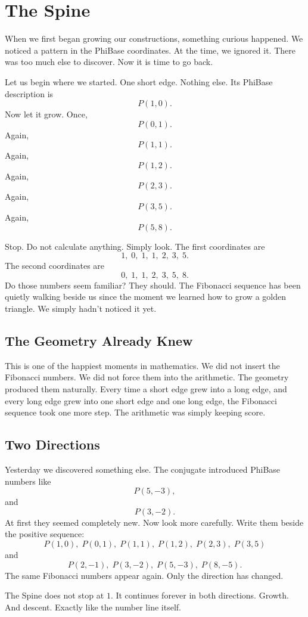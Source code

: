 \chapter{The Spine}
\label{stone:spine}

When we first began growing our constructions, something curious happened. We noticed a pattern in the PhiBase coordinates. At the time, we ignored it. There was too much else to discover. Now it is time to go back.

Let us begin where we started. One short edge. Nothing else. Its PhiBase description is
\[
P(1,0).
\]
Now let it grow. Once,
\[
P(0,1).
\]
Again,
\[
P(1,1).
\]
Again,
\[
P(1,2).
\]
Again,
\[
P(2,3).
\]
Again,
\[
P(3,5).
\]
Again,
\[
P(5,8).
\]

Stop. Do not calculate anything. Simply look. The first coordinates are
\[
1,\;0,\;1,\;1,\;2,\;3,\;5.
\]
The second coordinates are
\[
0,\;1,\;1,\;2,\;3,\;5,\;8.
\]
Do those numbers seem familiar? They should. The Fibonacci sequence has been quietly walking beside us since the moment we learned how to grow a golden triangle. We simply hadn't noticed it yet.

\section*{The Geometry Already Knew}

This is one of the happiest moments in mathematics. We did not insert the Fibonacci numbers. We did not force them into the arithmetic. The geometry produced them naturally. Every time a short edge grew into a long edge, and every long edge grew into one short edge and one long edge, the Fibonacci sequence took one more step. The arithmetic was simply keeping score.

\section*{Two Directions}

Yesterday we discovered something else. The conjugate introduced PhiBase numbers like
\[
P(5,-3),
\]
and
\[
P(3,-2).
\]
At first they seemed completely new. Now look more carefully. Write them beside the positive sequence:
\[
P(1,0),\; P(0,1),\; P(1,1),\; P(1,2),\; P(2,3),\; P(3,5)
\]
and
\[
P(2,-1),\; P(3,-2),\; P(5,-3),\; P(8,-5).
\]
The same Fibonacci numbers appear again. Only the direction has changed.

The Spine does not stop at \(1\). It continues forever in both directions. Growth. And descent. Exactly like the number line itself.

